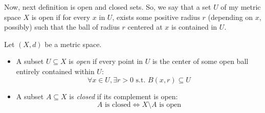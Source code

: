 \begin{math-stroke}
\begin{center}
\end{center}
\end{math-stroke}

\begin{spoken-clean}[00:04:51 - 00:05:52]
Now, next definition is open and closed sets.  So, we say that a set $U$ of my metric space $X$ is open if for every $x$ in $U$, exists some positive radius $r$ (depending on $x$, possibly) such that the ball of radius $r$ centered at $x$ is contained in $U$.
\end{spoken-clean}

\begin{math-stroke}
\setcounter{theorem}{38}
\begin{definition}\label{def:open-closed-sets}
Let $(X, d)$ be a metric space.
\begin{itemize}
    \setcounter{enumi}{0} \item A subset $U \subseteq X$ is \emph{open} if every point in $U$ is the center of some open ball entirely contained within $U$:
    \[ \forall x \in U, \exists r > 0 \text{ s.t. } B(x, r) \subseteq U \]
    \setcounter{enumi}{1} \item A subset $A \subseteq X$ is \emph{closed} if its complement is open:
    \[ A \text{ is closed} \iff X \setminus A \text{ is open} \]
\end{itemize}
\end{definition}
\end{math-stroke}


